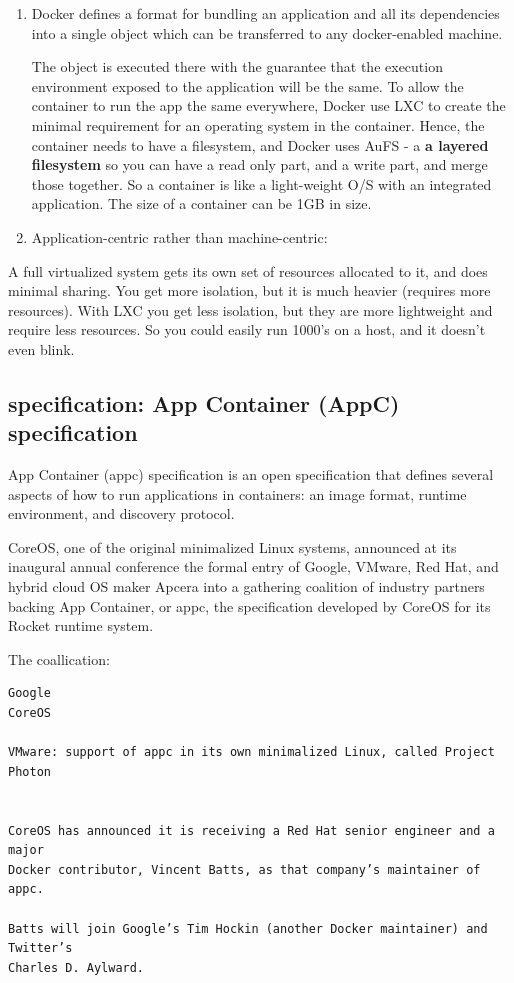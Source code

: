 \begin{enumerate}
  \item Docker defines a format for bundling an application and all its
  dependencies into a single object which can be transferred to any
  docker-enabled machine.
  
  The object is  executed there with the guarantee that the execution
  environment exposed to the application will be the same. To allow the
  container to run the app the same everywhere, Docker use LXC to create the
  minimal requirement for an operating system in the container. Hence, the
  container needs to have a filesystem, and Docker uses AuFS - a {\bf a layered
  filesystem}  so you can have a read only part, and a write part, and merge
  those together. So a container is like a light-weight O/S with an integrated
  application. The size of a container can be 1GB in size.
  
  \item Application-centric rather than machine-centric:
  
\end{enumerate}

A full virtualized system gets its own set of resources allocated to it, and
does minimal sharing. You get more isolation, but it is much heavier (requires
more resources). With LXC you get less isolation, but they are more lightweight
and require less resources. So you could easily run 1000's on a host, and it
doesn't even blink.



\subsection{specification: App Container (AppC) specification}
\label{sec:AppC-specification}

App Container (appc) specification is an open specification that defines several
aspects of how to run applications in containers: an image format, runtime
environment, and discovery protocol.

CoreOS, one of the original minimalized Linux systems, announced at its
inaugural annual conference the formal entry of Google, VMware, Red Hat, and
hybrid cloud OS maker Apcera into a gathering coalition of industry partners
backing App Container, or appc, the specification developed by CoreOS for its
Rocket runtime system.

The coallication:
\begin{verbatim}
Google
CoreOS

VMware: support of appc in its own minimalized Linux, called Project Photon


CoreOS has announced it is receiving a Red Hat senior engineer and a major
Docker contributor, Vincent Batts, as that company’s maintainer of appc.

Batts will join Google’s Tim Hockin (another Docker maintainer) and Twitter’s
Charles D. Aylward.
\end{verbatim}

